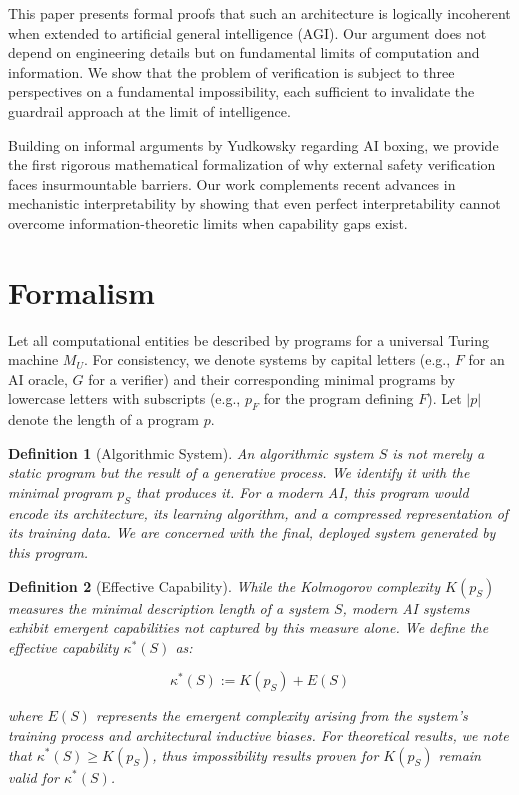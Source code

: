 \documentclass[11pt]{article}
\newtheorem{definition}{Definition}
\begin{document}
This paper presents formal proofs that such an architecture is logically incoherent when extended to artificial general intelligence (AGI). Our argument does not depend on engineering details but on fundamental limits of computation and information. We show that the problem of verification is subject to three perspectives on a fundamental impossibility, each sufficient to invalidate the guardrail approach at the limit of intelligence.

Building on informal arguments by Yudkowsky \cite{yudkowsky2002ai} regarding AI boxing, we provide the first rigorous mathematical formalization of why external safety verification faces insurmountable barriers. Our work complements recent advances in mechanistic interpretability \cite{olah2020zoom, elhage2021mathematical} by showing that even perfect interpretability cannot overcome information-theoretic limits when capability gaps exist.

\section{Formalism}
Let all computational entities be described by programs for a universal Turing machine $M_U$. For consistency, we denote systems by capital letters (e.g., $F$ for an AI oracle, $G$ for a verifier) and their corresponding minimal programs by lowercase letters with subscripts (e.g., $p_F$ for the program defining $F$). Let $|p|$ denote the length of a program $p$.

\begin{definition}[Algorithmic System]
An algorithmic system $S$ is not merely a static program but the result of a generative process. We identify it with the minimal program $p_S$ that produces it. For a modern AI, this program would encode its architecture, its learning algorithm, and a compressed representation of its training data. We are concerned with the final, deployed system generated by this program.
\end{definition}

\begin{definition}[Effective Capability]
While the Kolmogorov complexity $K(p_S)$ measures the minimal description length of a system $S$, modern AI systems exhibit emergent capabilities not captured by this measure alone. We define the \emph{effective capability} $\kappa^*(S)$ as:

\[\kappa^*(S) := K(p_S) + E(S)\]

where $E(S)$ represents the emergent complexity arising from the system's training process and architectural inductive biases. For theoretical results, we note that $\kappa^*(S) \geq K(p_S)$, thus impossibility results proven for $K(p_S)$ remain valid for $\kappa^*(S)$.
\end{definition}
\end{document}
